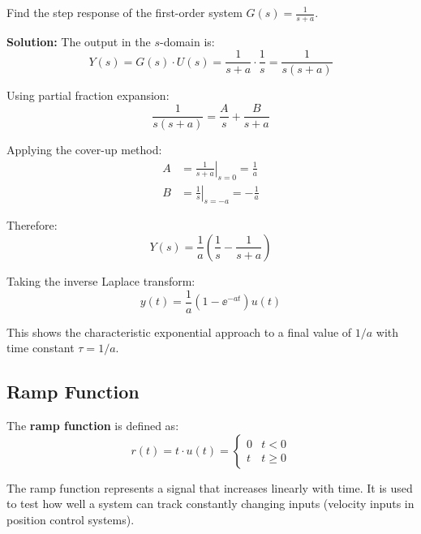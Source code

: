 \begin{examplebox}[title=Example 10.1: Step Response of a First-Order System]
Find the step response of the first-order system $G(s) = \frac{1}{s+a}$.

\textbf{Solution:}
The output in the $s$-domain is:
\begin{equation}
Y(s) = G(s) \cdot U(s) = \frac{1}{s+a} \cdot \frac{1}{s} = \frac{1}{s(s+a)}
\end{equation}

Using partial fraction expansion:
\begin{equation}
\frac{1}{s(s+a)} = \frac{A}{s} + \frac{B}{s+a}
\end{equation}

Applying the cover-up method:
\begin{align}
A &= \left.\frac{1}{s+a}\right|_{s=0} = \frac{1}{a} \\
B &= \left.\frac{1}{s}\right|_{s=-a} = -\frac{1}{a}
\end{align}

Therefore:
\begin{equation}
Y(s) = \frac{1}{a}\left(\frac{1}{s} - \frac{1}{s+a}\right)
\end{equation}

Taking the inverse Laplace transform:
\begin{equation}
\boxed{y(t) = \frac{1}{a}(1 - \ee^{-at})u(t)}
\end{equation}

This shows the characteristic exponential approach to a final value of $1/a$ with time constant $\tau = 1/a$.
\end{examplebox}

\subsection{Ramp Function}

\begin{definitionbox}[title=Definition 10.3: Ramp Function]
The \textbf{ramp function} is defined as:
\begin{equation}
r(t) = t \cdot u(t) = \begin{cases} 0 & t < 0 \\ t & t \geq 0 \end{cases}
\end{equation}
\end{definitionbox}

The ramp function represents a signal that increases linearly with time. It is used to test how well a system can track constantly changing inputs (velocity inputs in position control systems).

